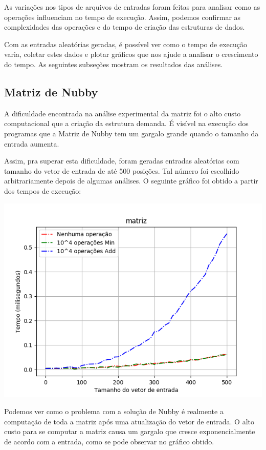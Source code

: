 \documentclass{article}
\begin{document}
As variações nos tipos de arquivos de entradas foram feitas para analisar como as operações influenciam no tempo de execução. Assim, podemos confirmar as complexidades das operações e do tempo de criação das estruturas de dados.

Com as entradas aleatórias geradas, é possível ver como o tempo de execução varia, coletar estes dados e plotar gráficos que nos ajude a analisar o crescimento do tempo. As seguintes subseções mostram os resultados das análises.

\subsection{Matriz de Nubby}

A dificuldade encontrada na análise experimental da matriz foi o alto custo computacional que a criação da estrutura demanda. É visível na execução dos programas que a Matriz de Nubby tem um gargalo grande quando o tamanho da entrada aumenta.

Assim, pra superar esta dificuldade, foram geradas entradas aleatórias com tamanho do vetor de entrada de até 500 posições. Tal número foi escolhido arbitrariamente depois de algumas análises. O seguinte gráfico foi obtido a partir dos tempos de execução:

\includegraphics[scale=0.70]{matriz}

Podemos ver como o problema com a solução de Nubby é realmente a computação de toda a matriz após uma atualização do vetor de entrada. O alto custo para se computar a matriz causa um gargalo que cresce exponencialmente de acordo com a entrada, como se pode observar no gráfico obtido.
\end{document}
